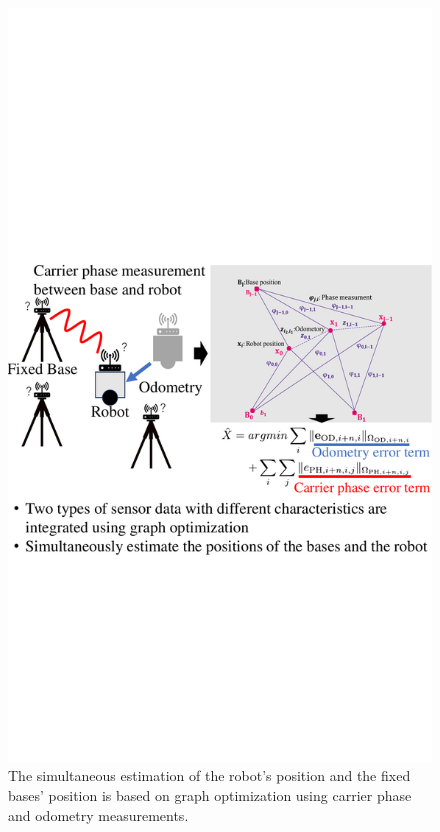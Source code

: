 \documentclass[a4jsme]{jsmepaper}
\begin{document}
\begin{figure}[tb]
    \centering
    \includegraphics[width=0.99\linewidth]{figures/Fig1.pdf}
    \caption{The simultaneous estimation of the robot's position and the fixed bases' position is based on graph optimization using carrier phase and odometry measurements.}
    \label{fig:fig1}
\end{figure}
\end{document}
